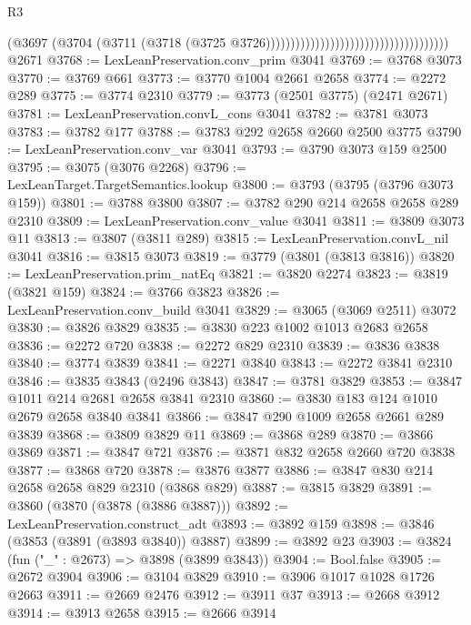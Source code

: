 \begin{lexlean}{R3}
\begin{coremodule}
                                                                    (@3697
                                                                      (@3704
                                                                        (@3711
                                                                          (@3718
                                                                            (@3725
                                                                              @3726)))))))))))))))))))))))))))))))))))))
    @2671
@3768 := LexLeanPreservation.conv_prim @3041
@3769 := @3768 @3073
@3770 := @3769 @661
@3773 := @3770 @1004 @2661 @2658
@3774 := @2272 @289
@3775 := @3774 @2310
@3779 := @3773 (@2501 @3775) (@2471 @2671)
@3781 := LexLeanPreservation.convL_cons @3041
@3782 := @3781 @3073
@3783 := @3782 @177
@3788 := @3783 @292 @2658 @2660 @2500 @3775
@3790 := LexLeanPreservation.conv_var @3041
@3793 := @3790 @3073 @159 @2500
@3795 := @3075 (@3076 @2268)
@3796 := LexLeanTarget.TargetSemantics.lookup
@3800 := @3793 (@3795 (@3796 @3073 @159))
@3801 := @3788 @3800
@3807 := @3782 @290 @214 @2658 @2658 @289 @2310
@3809 := LexLeanPreservation.conv_value @3041
@3811 := @3809 @3073 @11
@3813 := @3807 (@3811 @289)
@3815 := LexLeanPreservation.convL_nil @3041
@3816 := @3815 @3073
@3819 := @3779 (@3801 (@3813 @3816))
@3820 := LexLeanPreservation.prim_natEq
@3821 := @3820 @2274
@3823 := @3819 (@3821 @159)
@3824 := @3766 @3823
@3826 := LexLeanPreservation.conv_build @3041
@3829 := @3065 (@3069 @2511) @3072
@3830 := @3826 @3829
@3835 := @3830 @223 @1002 @1013 @2683 @2658
@3836 := @2272 @720
@3838 := @2272 @829 @2310
@3839 := @3836 @3838
@3840 := @3774 @3839
@3841 := @2271 @3840
@3843 := @2272 @3841 @2310
@3846 := @3835 @3843 (@2496 @3843)
@3847 := @3781 @3829
@3853 := @3847 @1011 @214 @2681 @2658 @3841 @2310
@3860 := @3830 @183 @124 @1010 @2679 @2658 @3840 @3841
@3866 := @3847 @290 @1009 @2658 @2661 @289 @3839
@3868 := @3809 @3829 @11
@3869 := @3868 @289
@3870 := @3866 @3869
@3871 := @3847 @721
@3876 := @3871 @832 @2658 @2660 @720 @3838
@3877 := @3868 @720
@3878 := @3876 @3877
@3886 := @3847 @830 @214 @2658 @2658 @829 @2310 (@3868 @829)
@3887 := @3815 @3829
@3891 := @3860 (@3870 (@3878 (@3886 @3887)))
@3892 := LexLeanPreservation.construct_adt
@3893 := @3892 @159
@3898 := @3846 (@3853 (@3891 (@3893 @3840)) @3887)
@3899 := @3892 @23
@3903 := @3824 (fun ("_" : @2673) => @3898 (@3899 @3843))
@3904 := Bool.false
@3905 := @2672 @3904
@3906 := @3104 @3829
@3910 := @3906 @1017 @1028 @1726 @2663
@3911 := @2669 @2476
@3912 := @3911 @37
@3913 := @2668 @3912
@3914 := @3913 @2658
@3915 := @2666 @3914

\end{coremodule}
\end{lexlean}
